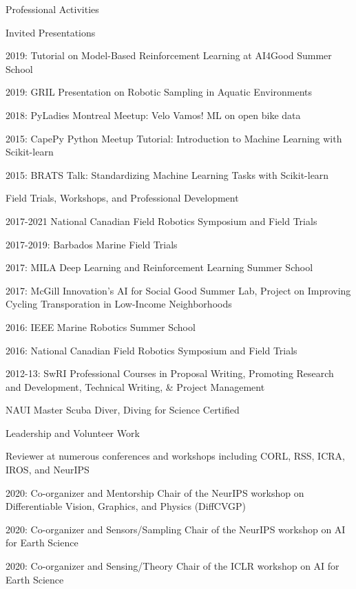 \documentclass{resume} %
\begin{document}
\begin{rSection}{Professional Activities}
\begin{rSubsection}{Invited Presentations}{}{}{}
\item{2019: Tutorial on Model-Based Reinforcement Learning at AI4Good Summer School}
\item{2019: GRIL Presentation on Robotic Sampling in Aquatic Environments}	
\item{2018: PyLadies Montreal Meetup: Velo Vamos! ML on open bike data}
\item{2015: CapePy Python Meetup Tutorial: Introduction to Machine Learning with Scikit-learn }
\item{2015: BRATS Talk: Standardizing Machine Learning Tasks with Scikit-learn }
\end{rSubsection}
\begin{rSubsection}{Field Trials, Workshops, and Professional Development}{}{}{}
\item{2017-2021 National Canadian Field Robotics Symposium and Field Trials}
\item{2017-2019: Barbados Marine Field Trials}
\item{2017: MILA Deep Learning and Reinforcement Learning Summer School}
\item{2017: McGill Innovation's AI for Social Good Summer Lab, Project on Improving Cycling Transporation in Low-Income Neighborhoods}
\item{2016: IEEE Marine Robotics Summer School}
\item{2016: National Canadian Field Robotics Symposium and Field Trials}
\item{2012-13: SwRI Professional Courses in Proposal Writing, Promoting Research and Development, Technical Writing, \& Project Management}
\item{NAUI Master Scuba Diver, Diving for Science Certified}
\end{rSubsection}
\vspace{-.2cm}
\begin{rSubsection}{Leadership and Volunteer Work}{}{}{}
\item{Reviewer at numerous conferences and workshops including CORL, RSS, ICRA, IROS, and NeurIPS}
\item{2020: Co-organizer and Mentorship Chair of the NeurIPS workshop on Differentiable Vision, Graphics, and Physics (DiffCVGP)}
\item{2020: Co-organizer and Sensors/Sampling Chair of the NeurIPS workshop on AI for Earth Science}
\item{2020: Co-organizer and Sensing/Theory Chair of the ICLR workshop on AI for Earth Science}

\end{rSubsection}
\end{rSection}
\end{document}

